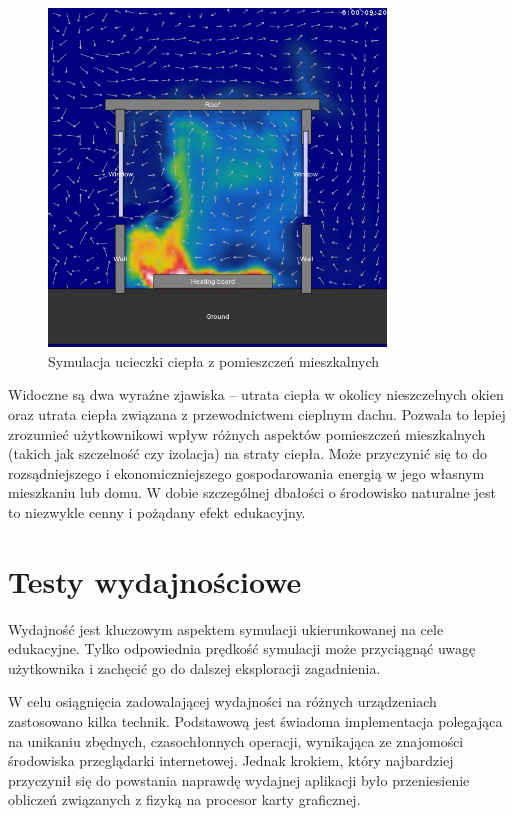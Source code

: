 \begin{figure}[!h]
\centering
\includegraphics[width=0.8\textwidth]{img/physics/wind}
\caption{Symulacja ucieczki ciepła z pomieszczeń mieszkalnych}
\label{fig:wind}
\end{figure}

Widoczne są dwa wyraźne zjawiska -- utrata ciepła w okolicy nieszczelnych
okien oraz utrata ciepła związana z przewodnictwem cieplnym dachu. Pozwala to
lepiej zrozumieć użytkownikowi wpływ różnych aspektów pomieszczeń mieszkalnych
(takich jak szczelność czy izolacja) na straty ciepła. Może przyczynić się to
do rozsądniejszego i ekonomiczniejszego gospodarowania energią w jego własnym
mieszkaniu lub domu. W dobie szczególnej dbałości o środowisko naturalne jest
to niezwykle cenny i pożądany efekt edukacyjny.

\section{Testy wydajnościowe}
\label{sec:testyWydajnosciowe}

Wydajność jest kluczowym aspektem symulacji ukierunkowanej na cele edukacyjne.
Tylko odpowiednia prędkość symulacji może przyciągnąć uwagę użytkownika i
zachęcić go do dalszej eksploracji zagadnienia.

W celu osiągnięcia zadowalającej wydajności na różnych urządzeniach zastosowano
kilka technik. Podstawową jest świadoma implementacja polegająca na unikaniu
zbędnych, czasochłonnych operacji, wynikająca ze znajomości środowiska
przeglądarki internetowej. Jednak krokiem, który najbardziej przyczynił się do
powstania naprawdę wydajnej aplikacji było przeniesienie obliczeń związanych
z fizyką na procesor karty graficznej.

